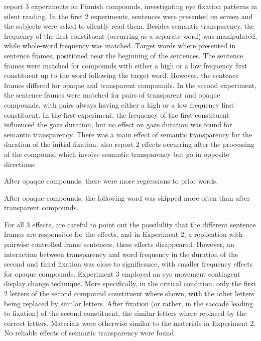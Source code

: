 \citet{PollatsekandHyona:2005} report 3 experiments on Finnish
compounds, investigating eye fixation patterns in silent reading.
In the first 2 experiments, sentences were presented on screen and the
subjects were asked to silently read them. Besides semantic
transparency, the frequency of the first constituent (occurring as a
separate word) was manipulated, while whole-word frequency was
matched. 
Target words where presented in sentence frames, positioned
near the beginning of the sentences. The sentence frames were matched
for compounds with either a high or a low frequency first constituent
up to the word following the target word. However, the sentence frames
differed for opaque and transparent compounds. In the second
experiment, the sentence frames were matched for pairs of transparent
and opaque compounds, with pairs always having either a high or a low
frequency first constituent. In the first experiment, the frequency
of the first constituent influenced the gaze duration, but no effect
on gaze duration was found for semantic transparency. There was a main
effect of semantic transparency for the duration of the initial
fixation. \citet{PollatsekandHyona:2005} also report 2 effects
occurring after the processing of the compound which involve semantic
transparency but go in opposite directions:
\begin{inparaenum}[(1)]
\item After opaque compounds, there were more regressions to prior words.
\item After opaque compounds, the following word was skipped more
  often than after transparent compounds.
\end{inparaenum} For all 3 effects, \citet{PollatsekandHyona:2005}
are careful to point out the possibility that the different sentence frames are responsible for the effects, and in Experiment 2, a replication with pairwise controlled frame
sentences, these effects disappeared. However, an interaction between
transparency and word frequency in the duration of the second and third
fixation was close to significance, with smaller frequency effects for
opaque compounds.
Experiment 3 employed an eye movement contingent display change
technique. %
More specifically, in the critical condition, only the
first 2 letters of the second compound constituent where shown, with
the other letters being replaced by similar letters. After fixation
(or rather, in the saccade leading to fixation) of the second
constituent, the similar letters where replaced by the correct
letters. Materials were otherwise similar to the materials in
Experiment 2. No reliable effects of semantic transparency
were found. 

